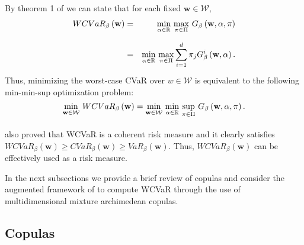 \documentclass[a4paper,12pt]{report}
\begin{document}
\begin{refsection}
\vspace{0.3cm}
By theorem 1 of \citet*{zhu2009worst} we can state that for each fixed $%
\mathbf{w}\in \mathcal{W}$,
\begin{eqnarray}
WCVaR_{\beta }\left( \mathbf{w}\right) &=&\underset{}{\underset{\alpha \in
		\mathbb{R}
	}{\min }~\underset{\pi \in \Pi }{\max }}~G_{\beta }\left( \mathbf{w},\alpha
,\pi \right)  \notag \\
&=&\underset{}{\underset{\alpha \in
		\mathbb{R}
	}{\min }~\underset{\pi \in \Pi }{\max }}\sum_{i=1}^{d}\pi _{j}G_{\beta
}^{i}\left( \mathbf{w},\alpha \right) .  \label{18}
\end{eqnarray}%
Thus, minimizing the worst-case CVaR over $w\in \mathcal{W}$ is equivalent
to the following min-min-sup optimization problem:
\begin{equation}
\underset{}{\underset{\mathbf{w}\in \mathcal{W}}{\min }}~WCVaR_{\beta
}\left( \mathbf{w}\right) =\underset{}{\underset{\mathbf{w}\in \mathcal{W}}{%
		\min }~\underset{\alpha \in
		\mathbb{R}
	}{\min }~\underset{\pi \in \Pi }{\sup }}~G_{\beta }\left( \mathbf{w},\alpha
,\pi \right) .  \label{19}
\end{equation}%
\citet*{zhu2009worst} also proved that WCVaR is a coherent risk measure and
it clearly satisfies $WCVaR_{\beta }\left( \mathbf{w}\right) \geq
CVaR_{\beta }\left( \mathbf{w}\right) \geq VaR_{\beta }\left( \mathbf{w}%
\right) $. Thus, $WCVaR_{\beta }\left( \mathbf{w}\right) $ can be
effectively used as a risk measure.

\bigskip

In the next subsections we provide a brief review of copulas and consider
the augmented framework of \citet*{kakouris14} to compute WCVaR through the
use of multidimensional mixture archimedean copulas.

\vspace{0.6cm}

\subsection{Copulas}


\end{refsection}
\end{document}
